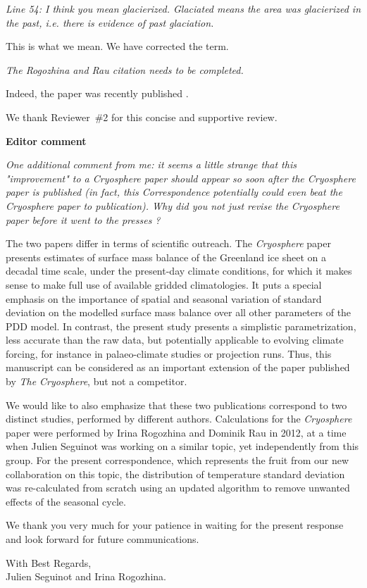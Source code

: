 \documentclass[10pt]{article}
\def\referee#1{\bigskip\textcolor{blue!50!black}{\textit{#1}}}
\begin{document}

\referee{Line 54: I think you mean glacierized. Glaciated means the area was glacierized in the past, i.e. there is evidence of past glaciation.}

This is what we mean. We have corrected the term.

\referee{The Rogozhina and Rau citation needs to be completed.}

Indeed, the paper was recently published \citep{rogozhina-rau-2014}.

We thank Reviewer~{\#}2 for this concise and supportive review.


\bigskip
\textbf{Editor comment}

\referee{One additional comment from me: it seems a little strange that this "improvement" to a \emph{Cryosphere} paper should appear so soon after the \emph{Cryosphere} paper is published (in fact, this Correspondence potentially could even beat the \emph{Cryosphere} paper to publication). Why did you not just revise the \emph{Cryosphere} paper before it went to the presses ?}

The two papers differ in terms of scientific outreach. The \emph{Cryosphere} paper presents estimates of surface mass balance of the Greenland ice sheet on a decadal time scale, under the present-day climate conditions, for which it makes sense to make full use of available gridded climatologies. It puts a special emphasis on the importance of spatial and seasonal variation of standard deviation on the modelled surface mass balance over all other parameters of the PDD model. In contrast, the present study presents a simplistic parametrization, less accurate than the raw data, but potentially applicable to evolving climate forcing, for instance in palaeo-climate studies or projection runs. Thus, this manuscript can be considered as an important extension of the paper published by \emph{The Cryosphere}, but not a competitor.

We would like to also emphasize that these two publications correspond to two distinct studies, performed by different authors. Calculations for the \emph{Cryosphere} paper were performed by Irina Rogozhina and Dominik Rau in 2012, at a time when Julien Seguinot was working on a similar topic, yet independently from this group. For the present correspondence, which represents the fruit from our new collaboration on this topic, the distribution of temperature standard deviation was re-calculated from scratch using an updated algorithm to remove unwanted effects of the seasonal cycle.

We thank you very much for your patience in waiting for the present response and look forward for future communications.

{\flushright
    With Best Regards,\\
    Julien Seguinot and Irina Rogozhina.\\
}



\end{document}
